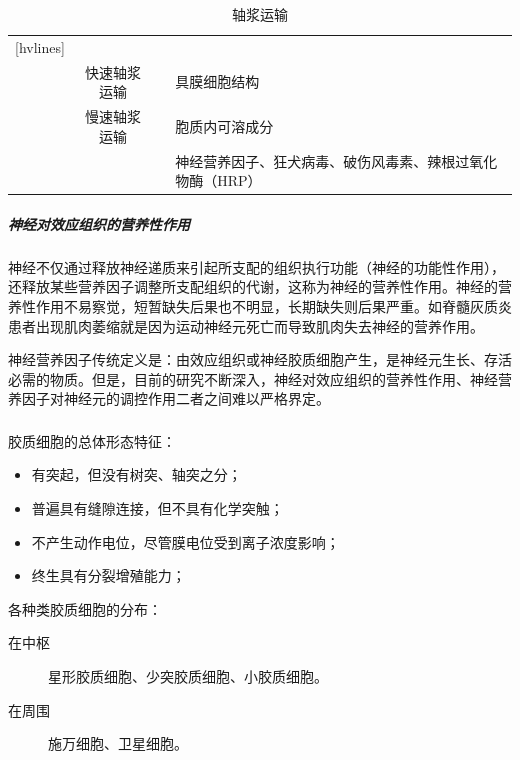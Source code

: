 \begin{table}[htbp]
	\centering
	\begin{NiceTabularX}{\textwidth}{cccX}[hvlines]
		 &  &  &  \\
		 & 快速轴浆运输 &  & 具膜细胞结构 \\
		& 慢速轴浆运输 &  & 胞质内可溶成分 \\
		 & &  & 神经营养因子、狂犬病毒、破伤风毒素、辣根过氧化物酶（HRP）
	\end{NiceTabularX}
	\caption{轴浆运输}
	\label{tab:axoplama_trans}
\end{table}

\subparagraph{神经对效应组织的营养性作用}

神经不仅通过释放神经递质来引起所支配的组织执行功能（神经的功能性作用），还释放某些营养因子调整所支配组织的代谢，这称为神经的营养性作用。神经的营养性作用不易察觉，短暂缺失后果也不明显，长期缺失则后果严重。如脊髓灰质炎患者出现肌肉萎缩就是因为运动神经元死亡而导致肌肉失去神经的营养作用。

神经营养因子传统定义是：由效应组织或神经胶质细胞产生，是神经元生长、存活必需的物质。但是，目前的研究不断深入，神经对效应组织的营养性作用、神经营养因子对神经元的调控作用二者之间难以严格界定。

\subsubsection{}

胶质细胞的总体形态特征：
\begin{itemize}
	\item 有突起，但没有树突、轴突之分；
	\item 普遍具有缝隙连接，但不具有化学突触；
	\item 不产生动作电位，尽管膜电位受到离子浓度影响；
	\item 终生具有分裂增殖能力；
\end{itemize}

各种类胶质细胞的分布：
\begin{description}
	\item[在中枢] 星形胶质细胞、少突胶质细胞、小胶质细胞。
	\item[在周围] 施万细胞、卫星细胞。
\end{description}

\paragraph{}

